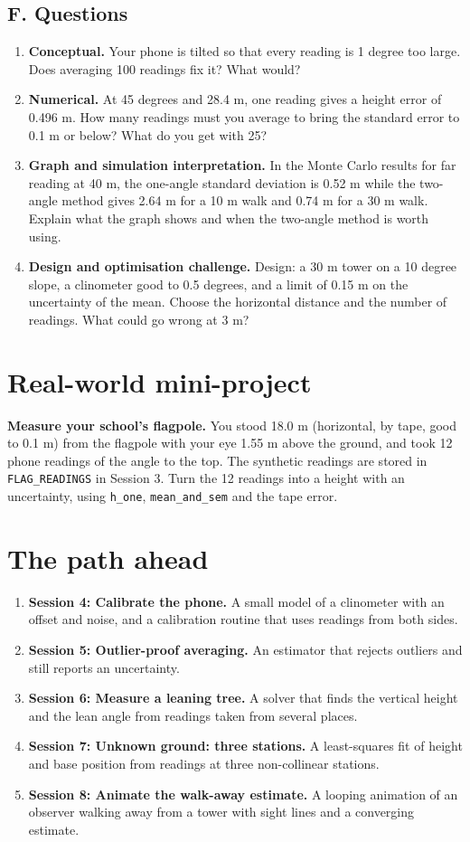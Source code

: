 \documentclass[11pt,a4paper]{article}
\begin{document}
\subsection*{F. Questions}
\begin{enumerate}[nosep]
\item \textbf{Conceptual.} Your phone is tilted so that every reading is 1 degree too large. Does averaging 100 readings fix it? What would?
\item \textbf{Numerical.} At 45 degrees and 28.4 m, one reading gives a height error of 0.496 m. How many readings must you average to bring the standard error to 0.1 m or below? What do you get with 25?
\item \textbf{Graph and simulation interpretation.} In the Monte Carlo results for far reading at 40 m, the one-angle standard deviation is 0.52 m while the two-angle method gives 2.64 m for a 10 m walk and 0.74 m for a 30 m walk. Explain what the graph shows and when the two-angle method is worth using.
\item \textbf{Design and optimisation challenge.} Design: a 30 m tower on a 10 degree slope, a clinometer good to 0.5 degrees, and a limit of 0.15 m on the uncertainty of the mean. Choose the horizontal distance and the number of readings. What could go wrong at 3 m?
\end{enumerate}

\section{Real-world mini-project}
\textbf{Measure your school's flagpole.} You stood 18.0 m (horizontal, by tape, good to 0.1 m) from the flagpole with your eye 1.55 m above the ground, and took 12 phone readings of the angle to the top. The synthetic readings are stored in \texttt{FLAG\_READINGS} in Session 3. Turn the 12 readings into a height with an uncertainty, using \texttt{h\_one}, \texttt{mean\_and\_sem} and the tape error.

\section{The path ahead}
\begin{enumerate}[nosep]
\item \textbf{Session 4: Calibrate the phone.} A small model of a clinometer with an offset and noise, and a calibration routine that uses readings from both sides.
\item \textbf{Session 5: Outlier-proof averaging.} An estimator that rejects outliers and still reports an uncertainty.
\item \textbf{Session 6: Measure a leaning tree.} A solver that finds the vertical height and the lean angle from readings taken from several places.
\item \textbf{Session 7: Unknown ground: three stations.} A least-squares fit of height and base position from readings at three non-collinear stations.
\item \textbf{Session 8: Animate the walk-away estimate.} A looping animation of an observer walking away from a tower with sight lines and a converging estimate.
\end{enumerate}
\end{document}
